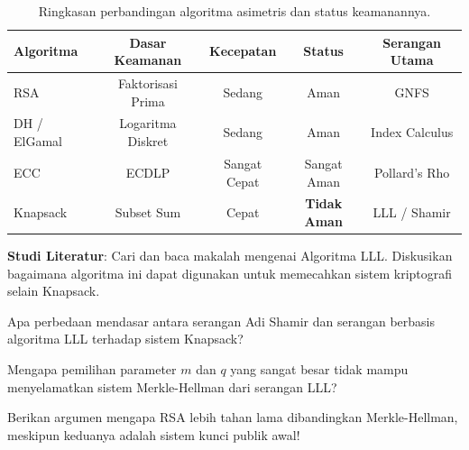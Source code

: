 \begin{table}[htbp]
  \centering
  \small
  \begin{tabular}{lcccc}
    \toprule
    \textbf{Algoritma} & \textbf{Dasar Keamanan} & \textbf{Kecepatan} & \textbf{Status} & \textbf{Serangan Utama} \\
    \midrule
    RSA & Faktorisasi Prima & Sedang & Aman & GNFS \\
    DH / ElGamal & Logaritma Diskret & Sedang & Aman & Index Calculus \\
    ECC & ECDLP & Sangat Cepat & Sangat Aman & Pollard's Rho \\
    Knapsack & Subset Sum & Cepat & \textbf{Tidak Aman} & LLL / Shamir \\
    \bottomrule
  \end{tabular}
  \caption{Ringkasan perbandingan algoritma asimetris dan status keamanannya.}
  \label{tab:perbandingan-asimetris-final}
\end{table}

\begin{aktivitas}
  \item \textbf{Studi Literatur}: Cari dan baca makalah mengenai Algoritma LLL. Diskusikan bagaimana algoritma ini dapat digunakan untuk memecahkan sistem kriptografi selain Knapsack.
\end{aktivitas}

\begin{latihan}
  \item Apa perbedaan mendasar antara serangan Adi Shamir dan serangan berbasis algoritma LLL terhadap sistem Knapsack?
  \item Mengapa pemilihan parameter $m$ dan $q$ yang sangat besar tidak mampu menyelamatkan sistem Merkle-Hellman dari serangan LLL?
  \item Berikan argumen mengapa RSA lebih tahan lama dibandingkan Merkle-Hellman, meskipun keduanya adalah sistem kunci publik awal!
\end{latihan}
